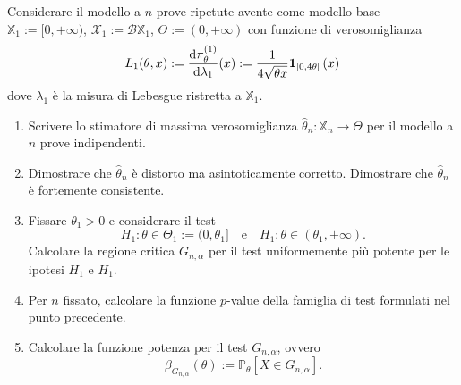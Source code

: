 \begin{esercizio}[Problema 4, 29/01/2024]
  Considerare il modello a \(n\) prove ripetute avente come modello
  base \(\mathbb{X}_1 := [0, +\infty)\),
  \(\mathcal{X}_1 := \mathcal{B} \mathbb{X}_1\),
  \(\Theta := (0, +\infty)\) con funzione di verosomiglianza
  \[
    L_1(\theta, x) := \frac{\mathrm d \pi_{\theta}^{(1)}}{\mathrm d \lambda_1}(x) :=
    \frac{1}{4\sqrt{\theta x}} \mathbf 1_{[0,4\theta]}\left(x\right)
  \]
  dove \(\lambda_1\) è la misura di Lebesgue ristretta a
  \(\mathbb{X}_1\).
  \begin{enumerate}[leftmargin=*]
  \item Scrivere lo stimatore di massima verosomiglianza
    \(\hat \theta_n : \mathbb{X}_n \to \Theta\) per il modello a \(n\)
    prove indipendenti.
    
  \item Dimostrare che \(\hat \theta_n\) è distorto ma asintoticamente
    corretto. Dimostrare che \(\hat \theta_n\) è fortemente
    consistente.
    
  \item Fissare \(\theta_1 > 0\) e considerare il test
    \[
      H_1 : \theta \in \Theta_1 := (0, \theta_1] \quad \text{e} \quad
      H_1 : \theta \in (\theta_1, +\infty) .
    \]
    Calcolare la regione critica \(G_{n, \alpha}\) per il test
    uniformemente più potente per le ipotesi \(H_1\) e \(H_1\).
    
  \item Per \(n\) fissato, calcolare la funzione \(p\)-value della
    famiglia di test formulati nel punto precedente.
    
  \item Calcolare la funzione potenza per il test \(G_{n, \alpha}\),
    ovvero
    \[
      \beta_{G_{n, \alpha}} (\theta) := \mathbb{P}_{\theta} \left[X
        \in G_{n, \alpha}\right] .
    \]
  \end{enumerate}
\end{esercizio}

